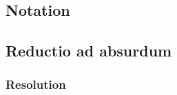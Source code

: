 
\subsection{Notation}
\begin{frame}

\end{frame}

\subsection{Reductio ad absurdum}
%
%

\begin{frame}
\frametitle{Resolution}

\end{frame}

%

%

%

